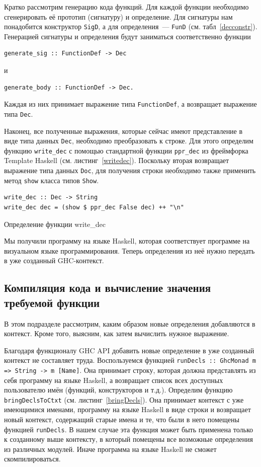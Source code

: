 	
		Кратко рассмотрим генерацию кода функций. Для каждой функции необходимо сгенерировать её прототип (сигнатуру) и определение. Для сигнатуры нам понадобится конструктор \lstinline!SigD!, а для определения~--- \lstinline!FunD! (см. табл~\ref{decconstr}). Генерацией сигнатуры и определения будут заниматься соответственно функции 
		\begin{lstlisting}
generate_sig :: FunctionDef -> Dec
		\end{lstlisting}
		и
		\begin{lstlisting}
generate_body :: FunctionDef -> Dec.
		\end{lstlisting}		
		Каждая из них принимает выражение типа \lstinline!FunctionDef!, а возвращает выражение типа \lstinline!Dec!.		

		Наконец, все полученные выражения, которые сейчас имеют представление в виде типа данных \lstinline!Dec!, необходимо преобразовать к строке. Для этого определим функцию \lstinline!write_dec! с помощью стандартной функции \lstinline!ppr_dec! из фреймфорка Template Haskell (см. листинг~\ref{writedec}). Поскольку вторая возвращает выражение типа данных \lstinline!Doc!, для получения строки необходимо также применить метод \lstinline!show! класса типов \lstinline!Show!.

\begin{ListingEnv}[h]
	\begin{lstlisting}
write_dec :: Dec -> String
write_dec dec = (show $ ppr_dec False dec) ++ "\n"
	\end{lstlisting}
	\caption{Определение функции write\_dec}\label{writedec}
\end{ListingEnv}		

		Мы получили программу на языке Haskell, которая соответствует программе на визуальном языке программирования. Теперь определения из неё нужно передать в уже созданный GHC-контекст.

	\subsection{Компиляция кода и вычисление значения требуемой функции}\label{basefuns}
		В этом подразделе рассмотрим, каким образом новые определения добавляются в контекст. Кроме того, выясним, как затем вычислить нужное выражение.
		
		Благодаря функционалу GHC API добавить новые определение в уже созданный контекст не составляет труда. Воспользуемся функцией \lstinline!runDecls :: GhcMonad m => String -> m [Name]!. Она принимает строку, которая должна представлять из себя программу на языке Haskell, а возвращает список всех доступных пользователю имён (функций, конструкторов и т.д.). Определим функцию \lstinline!bringDeclsToCtxt! (см. листинг~\ref{bringDecls}). Она принимает контекст с уже имеющимися именами, программу на языке Haskell в виде строки и возвращает новый контекст, содержащий старые имена и те, что были в него помещены функцией \lstinline!runDecls!. В нашем случае эта функция может быть применена только к созданному выше контексту, в который помещены все возможные определения из различных модулей. Иначе программа на языке Haskell не сможет скомпилироваться.
		
